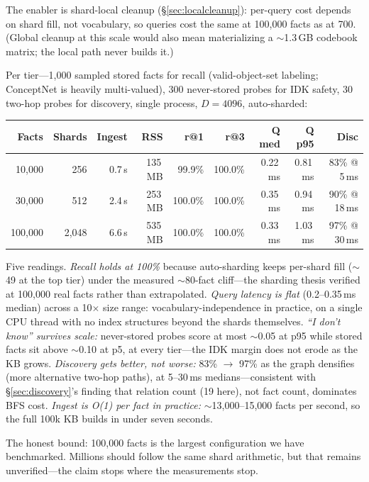 \documentclass[11pt]{article}
\begin{document}
The enabler is shard-local cleanup (\S\ref{sec:localcleanup}):
per-query cost depends on shard fill, not vocabulary, so queries
cost the same at 100{,}000 facts as at 700. (Global cleanup at this
scale would also mean materializing a $\sim$1.3\,GB codebook matrix;
the local path never builds it.)

Per tier---1{,}000 sampled stored facts for recall (valid-object-set
labeling; ConceptNet is heavily multi-valued), 300 never-stored
probes for IDK safety, 30 two-hop probes for discovery, single
process, $D=4096$, auto-sharded:

\begin{center}
\small
\begin{tabular}{rrrrrrrrr}
\toprule
Facts & Shards & Ingest & RSS & r@1 & r@3 & Q med & Q p95 & Disc \\
\midrule
10{,}000 & 256 & 0.7\,s & 135\,MB & 99.9\% & 100.0\% & 0.22\,ms & 0.81\,ms & 83\% @ 5\,ms \\
30{,}000 & 512 & 2.4\,s & 253\,MB & 100.0\% & 100.0\% & 0.35\,ms & 0.94\,ms & 90\% @ 18\,ms \\
100{,}000 & 2{,}048 & 6.6\,s & 535\,MB & 100.0\% & 100.0\% & 0.33\,ms & 1.03\,ms & 97\% @ 30\,ms \\
\bottomrule
\end{tabular}
\end{center}

Five readings. \emph{Recall holds at 100\%} because auto-sharding
keeps per-shard fill ($\sim$49 at the top tier) under the measured
$\sim$80-fact cliff---the sharding thesis verified at 100{,}000 real
facts rather than extrapolated. \emph{Query latency is flat}
(0.2--0.35\,ms median) across a 10$\times$ size range:
vocabulary-independence in practice, on a single CPU thread with no
index structures beyond the shards themselves. \emph{``I don't
know'' survives scale:} never-stored probes score at most $\sim$0.05
at p95 while stored facts sit above $\sim$0.10 at p5, at every
tier---the IDK margin does not erode as the KB grows.
\emph{Discovery gets better, not worse:} 83\% $\to$ 97\% as the
graph densifies (more alternative two-hop paths), at 5--30\,ms
medians---consistent with \S\ref{sec:discovery}'s finding that
relation count (19 here), not fact count, dominates BFS cost.
\emph{Ingest is O(1) per fact in practice:} $\sim$13{,}000--15{,}000
facts per second, so the full 100k KB builds in under seven seconds.

The honest bound: 100{,}000 facts is the largest configuration we
have benchmarked. Millions should follow the same shard arithmetic,
but that remains unverified---the claim stops where the measurements
stop.
\end{document}
